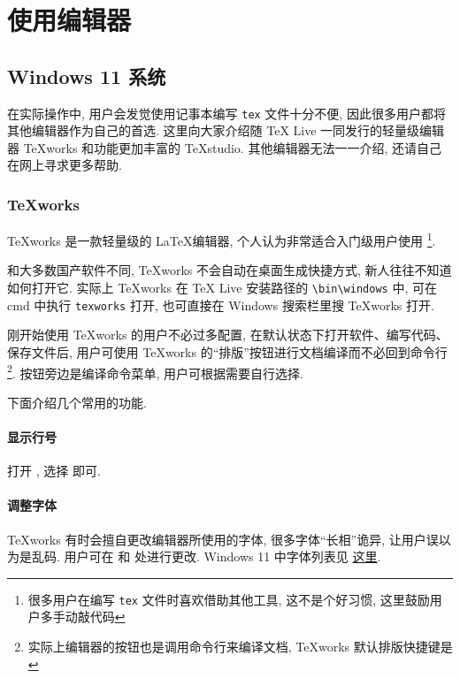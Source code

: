 
\chapter{使用编辑器}

\section{Windows 11 系统}

在实际操作中, 用户会发觉使用记事本编写 \texttt{tex} 文件十分不便,
因此很多用户都将其他编辑器作为自己的首选.
这里向大家介绍随 \TeX{} Live 一同发行的轻量级编辑器 \TeX works
和功能更加丰富的
\TeX studio.
其他编辑器无法一一介绍, 还请自己在网上寻求更多帮助. 

\subsection{\TeX works}

\TeX works 是一款轻量级的 \LaTeX 编辑器, 个人认为非常适合入门级用户使用%
\footnote{很多用户在编写 \texttt{tex} 文件时喜欢借助其他工具,
这不是个好习惯, 这里鼓励用户多手动敲代码}. 

和大多数国产软件不同, \TeX works 不会自动在桌面生成快捷方式,
新人往往不知道如何打开它. 
实际上 \TeX works 在 \TeX{} Live 安装路径的
\texttt{\textbackslash bin\textbackslash windows} 中,
可在 \textsf{cmd} 中执行 \texttt{texworks} 打开,
也可直接在 Windows 搜索栏里搜 \TeX works 打开. 

刚开始使用 \TeX works 的用户不必过多配置,
在默认状态下打开软件、编写代码、保存文件后,
用户可使用 \TeX works 的“排版”按钮进行文档编译而不必回到命令行%
\footnote{实际上编辑器的按钮也是调用命令行来编译文档,
\TeX works 默认排版快捷键是 }.
按钮旁边是编译命令菜单, 用户可根据需要自行选择. 

下面介绍几个常用的功能. 

\subsubsection{显示行号}

打开 , 选择  即可. 

\subsubsection{调整字体}

\TeX works 有时会擅自更改编辑器所使用的字体,
很多字体``长相''诡异,
让用户误以为是乱码.
用户可在 
和  处进行更改.
Windows 11 中字体列表见%
\href{https://docs.microsoft.com/en-us/typography/fonts/windows_11_font_list}{这里}.

